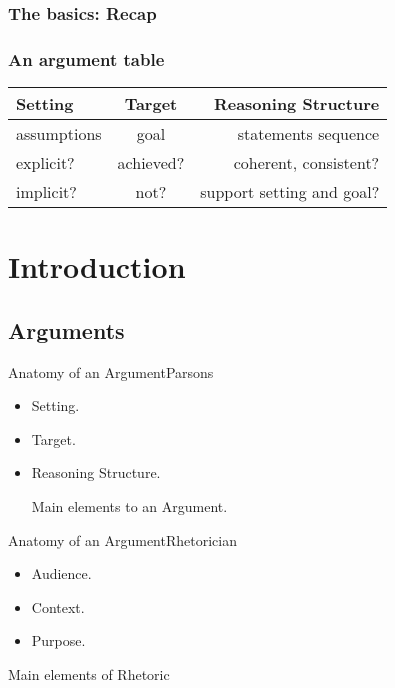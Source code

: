 \documentclass{beamer}
\begin{document}
\subsubsection{The basics: Recap} 
\begin{frame}\frametitle{An argument table}
\begin{center}
\begin{tabular}{|l|c|r|}
\hline
\textbf{Setting} & \textbf{Target} & \textbf{Reasoning Structure}\\
\hline 
assumptions & goal & statements sequence\\
\hline 
explicit? & achieved? & coherent, consistent?\\
\hline
implicit? & not? & support setting and goal? \\
\hline
\end{tabular}
\end{center}
\end{frame}

\section{Introduction}

\subsection[A Look at Argumentation]{Arguments}

\begin{frame}{Anatomy of an Argument}{Parsons}

  \begin{itemize}
  \item Setting.
    \item Target.
      \item Reasoning Structure.
    
    Main elements to an Argument.
  \end{itemize}
\end{frame}

\begin{frame}{Anatomy of an Argument}{Rhetorician}

  \begin{itemize}
  \item Audience.
    \item Context.
      \item Purpose.
  \end{itemize}
Main elements of Rhetoric
\end{frame}
\end{document}

